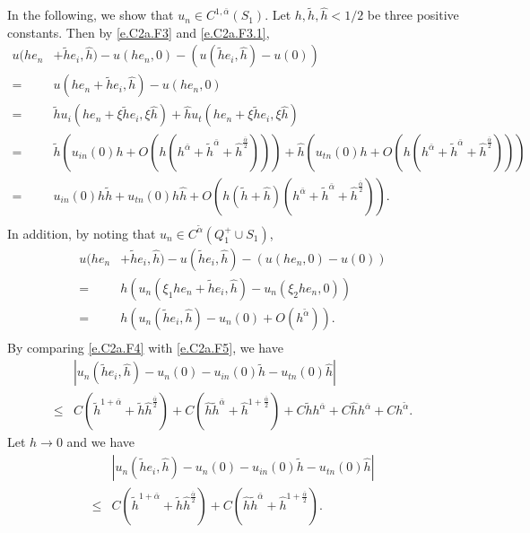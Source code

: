 \documentclass[preprint,12pt]{elsarticle}
\theoremstyle{definition}
\theoremstyle{remark}
\numberwithin{equation}{section}
\begin{document}
In the following, we show that $u_n\in C^{1,\bar\alpha}(S_1)$. Let $h,\tilde{h}, \hat{h}<1/2$ be three positive constants. Then by \cref{e.C2a.F3} and \cref{e.C2a.F3.1},
\begin{equation}\label{e.C2a.F4}
  \begin{aligned}
u(he_n&+\tilde{h}e_i, \hat{h})-u(he_n,0)-\left(u(\tilde{h}e_i, \hat{h})-u(0)\right)\\
=&u(he_n+\tilde{h}e_i, \hat{h})-u(he_n,0)\\
=&\tilde{h}u_i(he_n+\xi \tilde{h}e_i, \xi \hat{h})
+\hat{h} u_t(he_n+\xi \tilde{h}e_i, \xi \hat{h})\\
= & \tilde{h}\left(u_{in}(0)h+O (h(h^{\bar{\alpha}}+\tilde{h}^{\bar{\alpha}}+\hat{h}^{\frac{\bar{\alpha}}{2}}))\right)
+\hat{h}\left(u_{tn}(0) h+O (h(h^{\bar{\alpha}}+\tilde{h}^{\bar{\alpha}}+\hat{h}^{\frac{\bar{\alpha}}{2}}))\right)\\
= &u_{in}(0)h\tilde{h}+u_{tn}(0)h\hat{h}+
O (h(\tilde{h}+\hat{h})(h^{\bar{\alpha}}+\tilde{h}^{\bar{\alpha}}+\hat{h}^{\frac{\bar{\alpha}}{2}})).\\
  \end{aligned}
\end{equation}
In addition, by noting that $u_n\in C^{\tilde\alpha}(Q_1^+\cup S_1)$,
\begin{equation}\label{e.C2a.F5}
  \begin{aligned}
u(he_n&+\tilde{h}e_i,\hat{h})-u(\tilde{h}e_i,\hat{h})-\left(u(he_n,0)-u(0)\right)\\
=&h\left(u_n(\xi_1 he_n+\tilde{h}e_i,\hat{h})-u_n(\xi_2 he_n,0)\right)\\
=&h\left(u_n(\tilde{h}e_i,\hat{h})-u_n(0)+O(h^{\tilde \alpha})\right).\\
  \end{aligned}
\end{equation}
By comparing \cref{e.C2a.F4} with \cref{e.C2a.F5}, we have
\begin{equation*}
  \begin{aligned}
    &|u_n(\tilde{h}e_i,\hat{h})-u_n(0)-u_{in}(0)\tilde{h}-u_{tn}(0)\hat{h}|\\
\leq&  C\left(\tilde{h}^{1+\bar{\alpha}}+\tilde{h}\hat{h}^{\frac{\bar{\alpha}}{2}}\right)
+C\left(\hat{h}\tilde{h}^{\bar{\alpha}}+\hat{h}^{1+\frac{\bar{\alpha}}{2}}\right)
+C\tilde{h}h^{\bar{\alpha}}+C\hat{h}h^{\bar{\alpha}}+Ch^{\tilde \alpha}.
  \end{aligned}
\end{equation*}
Let $h\rightarrow 0$ and we have
\begin{equation*}
  \begin{aligned}
    &|u_n(\tilde{h}e_i,\hat{h})-u_n(0)-u_{in}(0)\tilde{h}-u_{tn}(0)\hat{h}|\\
\leq  &C\left(\tilde{h}^{1+\bar{\alpha}}+\tilde{h}\hat{h}^{\frac{\bar{\alpha}}{2}}\right)
+C\left(\hat{h}\tilde{h}^{\bar{\alpha}}+\hat{h}^{1+\frac{\bar{\alpha}}{2}}\right).
  \end{aligned}
\end{equation*}
\end{document}
